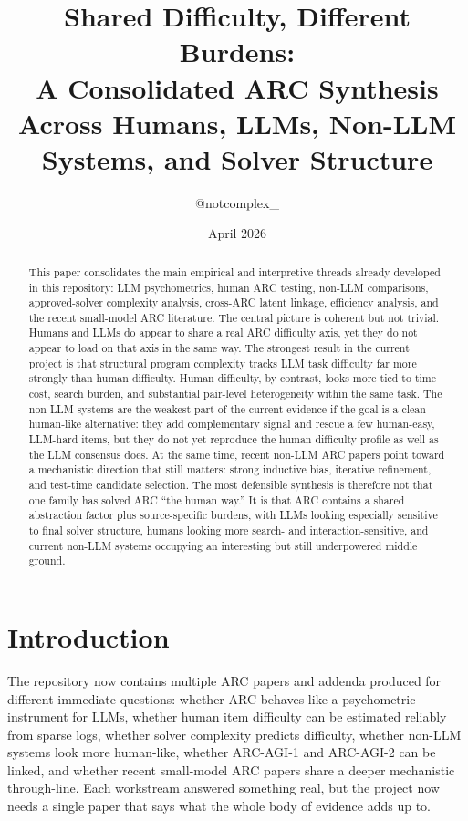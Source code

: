 \documentclass[11pt,letterpaper]{article}
\title{\textbf{Shared Difficulty, Different Burdens:}\\
\textbf{A Consolidated ARC Synthesis Across Humans, LLMs, Non-LLM Systems, and Solver Structure}}
\author{@notcomplex\_}
\date{April 2026}
\begin{document}
\maketitle

\begin{abstract}
This paper consolidates the main empirical and interpretive threads already developed in this repository: LLM psychometrics, human ARC testing, non-LLM comparisons, approved-solver complexity analysis, cross-ARC latent linkage, efficiency analysis, and the recent small-model ARC literature. The central picture is coherent but not trivial. Humans and LLMs do appear to share a real ARC difficulty axis, yet they do not appear to load on that axis in the same way. The strongest result in the current project is that structural program complexity tracks LLM task difficulty far more strongly than human difficulty. Human difficulty, by contrast, looks more tied to time cost, search burden, and substantial pair-level heterogeneity within the same task. The non-LLM systems are the weakest part of the current evidence if the goal is a clean human-like alternative: they add complementary signal and rescue a few human-easy, LLM-hard items, but they do not yet reproduce the human difficulty profile as well as the LLM consensus does. At the same time, recent non-LLM ARC papers point toward a mechanistic direction that still matters: strong inductive bias, iterative refinement, and test-time candidate selection. The most defensible synthesis is therefore not that one family has solved ARC ``the human way.'' It is that ARC contains a shared abstraction factor plus source-specific burdens, with LLMs looking especially sensitive to final solver structure, humans looking more search- and interaction-sensitive, and current non-LLM systems occupying an interesting but still underpowered middle ground.
\end{abstract}

\section{Introduction}

The repository now contains multiple ARC papers and addenda produced for different immediate questions: whether ARC behaves like a psychometric instrument for LLMs, whether human item difficulty can be estimated reliably from sparse logs, whether solver complexity predicts difficulty, whether non-LLM systems look more human-like, whether ARC-AGI-1 and ARC-AGI-2 can be linked, and whether recent small-model ARC papers share a deeper mechanistic through-line. Each workstream answered something real, but the project now needs a single paper that says what the whole body of evidence adds up to.
\end{document}
